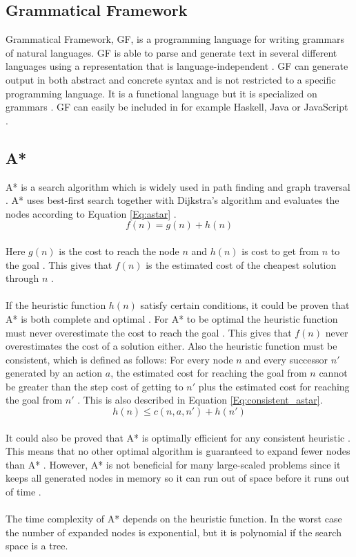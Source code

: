 \subsection{Grammatical Framework}
Grammatical Framework, GF, is a programming language for writing grammars of
natural languages. GF is able to parse and generate text in several different
languages using a representation that is language-independent \citep{gf_url}.
GF can generate output in both abstract and concrete syntax and is not
restricted to a specific programming language. It is a functional language but
it is specialized on grammars \citep{gf_url}. 
GF can easily be included in for example Haskell, Java or JavaScript \citep{gf_url}.

\subsection{A*}
A* is a search algorithm which is widely used in path finding and graph
traversal \citep{astar_url}. A* uses best-first search together with Dijkstra's
algorithm and evaluates the nodes according to Equation \ref{Eq:astar}
\citep{astar_url}. \\
\begin{equation}
f(n) = g(n) + h(n)
\label{Eq:astar}
\end{equation}\\
Here $g(n)$ is the cost to reach the node $n$ and $h(n)$ is cost to get from $n$
to the goal \citep{astar_url}. This gives that $f(n)$ is the estimated
cost of the cheapest solution through $n$ \citep{astar_url}. 
\\\\
If the heuristic function $h(n)$ satisfy certain conditions, it could be proven
that A* is both complete and optimal \citep{astar_ai}. For A* to be optimal the
heuristic function must never overestimate the cost to reach the goal
\citep{astar_ai}. This gives that $f(n)$ never overestimates the cost of a
solution either. Also the heuristic function must be consistent, which is
defined as follows: For every node $n$ and every successor $n'$ generated by an
action $a$, the estimated cost for reaching the goal from $n$ cannot be greater
than the step cost of getting to $n'$ plus the estimated cost for reaching the
goal from $n'$ \citep{astar_ai}. This is also described in Equation
\ref{Eq:consistent_astar}.\\
\begin{equation}
h(n) \leq c(n, a, n') + h(n')
\label{Eq:consistent_astar}
\end{equation}\\
It could also be proved that A* is optimally efficient for any consistent
heuristic \citep{astar_ai}. This means that no other optimal algorithm is
guaranteed to expand fewer nodes than A* \citep{astar_ai}. However, A* is not
beneficial for many large-scaled problems since it keeps all generated nodes in
memory so it can run out of space before it runs out of time
\citep{astar_ai}.\\\\ The time complexity of A* depends on the heuristic
function. In the worst case the number of expanded nodes is exponential, but it
is polynomial if the search space is a tree.
